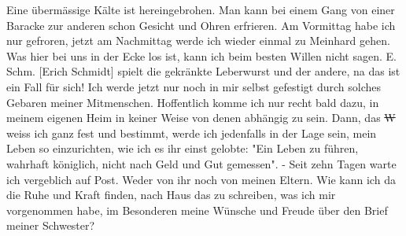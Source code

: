 \def\day{14. Februar 1943}
\mktitle

Eine \"{u}berm\"{a}ssige K\"{a}lte ist hereingebrohen.
Man kann bei einem Gang von einer Baracke zur anderen schon Gesicht und Ohren erfrieren.
Am Vormittag habe ich nur gefroren, jetzt am Nachmittag werde ich wieder einmal zu Meinhard gehen. Was hier bei uns in der Ecke los ist, kann ich beim besten Willen nicht sagen. E. Schm. {\color{red} [Erich Schmidt] } spielt die gekr\"{a}nkte Leberwurst und der andere, na das ist ein Fall f\"{u}r sich!
Ich werde jetzt nur noch in mir selbst gefestigt durch solches Gebaren meiner Mitmenschen.
Hoffentlich komme ich nur recht bald dazu, in meinem eigenen Heim in keiner Weise von denen abh\"{a}ngig zu sein.
Dann, das \st{W} weiss ich ganz fest und bestimmt, werde ich jedenfalls in der Lage sein, mein Leben so einzurichten, wie ich es ihr einst gelobte: "Ein Leben zu f\"{u}hren, wahrhaft k\"{o}niglich, nicht nach Geld und Gut gemessen".
- Seit zehn Tagen warte ich vergeblich auf Post.
Weder von ihr noch von meinen Eltern.
Wie kann ich da die Ruhe und Kraft finden, nach Haus das zu schreiben, was ich mir vorgenommen habe, im Besonderen meine W\"{u}nsche und Freude \"{u}ber den Brief meiner Schwester?

\clearpage
